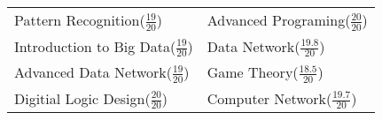 \renewcommand{\arraystretch}{1.2}
\begin{tabular}{ll}
  Pattern Recognition($\frac{19}{20}$)      &Advanced Programing($\frac{20}{20}$) \\
  Introduction to Big Data($\frac{19}{20}$) &Data Network($\frac{19.8}{20}$) \\
  Advanced Data Network($\frac{19}{20}$)    &Game Theory($\frac{18.5}{20}$) \\
  Digitial Logic Design($\frac{20}{20}$)    &Computer Network($\frac{19.7}{20}$) \\
\end{tabular}
